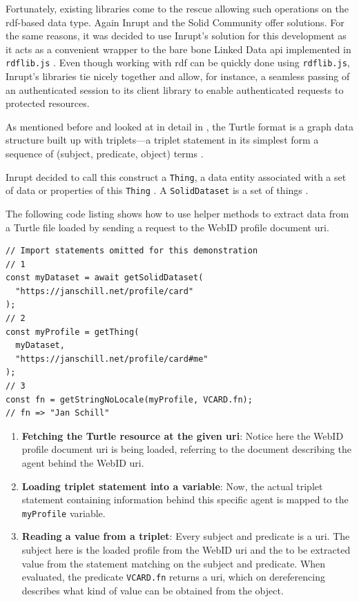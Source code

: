 Fortunately, existing libraries come to the rescue allowing such operations on the \gls{rdf}-based data type. Again Inrupt and the Solid Community offer solutions. For the same reasons, it was decided to use Inrupt's solution for this development as it acts as a convenient wrapper to the bare bone Linked Data \gls{api} implemented in \texttt{rdflib.js} \cite{rdflib-js}. Even though working with \gls{rdf} can be quickly done using \texttt{rdflib.js}, Inrupt's libraries tie nicely together and allow, for instance, a seamless passing of an authenticated session to its client library to enable authenticated requests to protected resources.

As mentioned before and looked at in detail in \cite{cern-solid-investigation-spec}, the Turtle format is a graph data structure built up with triplets---a triplet statement in its simplest form a sequence of (subject, predicate, object) terms \cite{Prud:hommeaux:14:RT}. 

Inrupt decided to call this construct a \texttt{Thing}, a data entity associated with a set of data or properties of this \texttt{Thing} \cite{inrupt-thing}. A \texttt{SolidDataset} is a set of things \cite{inrupt-dataset}.

The following code listing shows how to use helper methods to extract data from a Turtle file loaded by sending a request to the WebID profile document \gls{uri}.

\begin{lstlisting}[language=Other,columns=fullflexible, caption={Basic usage of Inrupt's solid-client library.}, label={lst:2}]
// Import statements omitted for this demonstration
// 1
const myDataset = await getSolidDataset(
  "https://janschill.net/profile/card"
);
// 2
const myProfile = getThing(
  myDataset,
  "https://janschill.net/profile/card#me"
);
// 3
const fn = getStringNoLocale(myProfile, VCARD.fn);
// fn => "Jan Schill"
\end{lstlisting}

\begin{enumerate}
    \item \textbf{Fetching the Turtle resource at the given \gls{uri}}: Notice here the WebID profile document \gls{uri} is being loaded, referring to the document describing the agent behind the WebID \gls{uri}.
    \item \textbf{Loading triplet statement into a variable}: Now, the actual triplet statement containing information behind this specific agent is mapped to the \texttt{myProfile} variable.
    \item \textbf{Reading a value from a triplet}: Every subject and predicate is a \gls{uri}. The subject here is the loaded profile from the WebID \gls{uri} and the to be extracted value from the statement matching on the subject and predicate. When evaluated, the predicate \texttt{VCARD.fn} returns a \gls{uri}, which on dereferencing describes what kind of value can be obtained from the object.
\end{enumerate}

